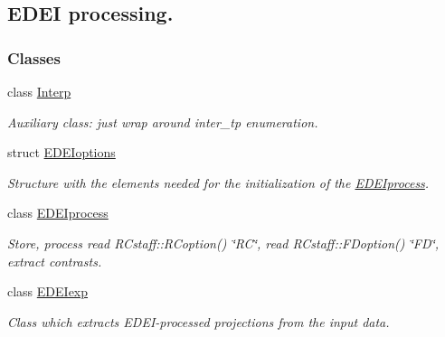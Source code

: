 \hypertarget{group__edeiedei}{
\subsection{EDEI processing.}
\label{group__edeiedei}
}
\subsubsection*{Classes}
\begin{DoxyCompactItemize}
\item 
class \hyperlink{classInterp}{Interp}
\begin{DoxyCompactList}\small\item\em Auxiliary class: just wrap around inter\_\-tp enumeration. \item\end{DoxyCompactList}\item 
struct \hyperlink{structEDEIoptions}{EDEIoptions}
\begin{DoxyCompactList}\small\item\em Structure with the elements needed for the initialization of the \hyperlink{classEDEIprocess}{EDEIprocess}. \item\end{DoxyCompactList}\item 
class \hyperlink{classEDEIprocess}{EDEIprocess}
\begin{DoxyCompactList}\small\item\em Store, process read RCstaff::RCoption() \char`\"{}RC\char`\"{}, read RCstaff::FDoption() \char`\"{}FD\char`\"{}, extract contrasts. \item\end{DoxyCompactList}\item 
class \hyperlink{classEDEIexp}{EDEIexp}
\begin{DoxyCompactList}\small\item\em Class which extracts EDEI-\/processed projections from the input data. \item\end{DoxyCompactList}\end{DoxyCompactItemize}
